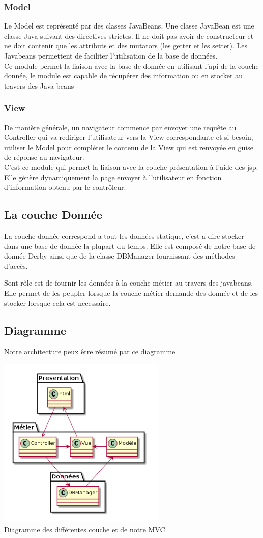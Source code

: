 \subsubsection{Model}
Le Model est représenté par des classes JavaBeans. Une classe JavaBean est une 
classe Java suivant des directives strictes. Il ne doit pas avoir de 
constructeur et ne doit contenir que les attributs et des mutators (les getter et les setter).
Les Javabeans permettent de faciliter l'utilisation de la base de données. \\
Ce module permet la liaison avec la base de donnée en utilisant l'api de la couche donnée, le module est capable de récupérer des information ou en stocker au travers des Java beans

\subsubsection{View}
De manière générale, un navigateur commence par envoyer une requête au 
Controller qui va rediriger l'utilisateur vers la View correspondante et si 
besoin, utiliser le Model pour compléter le contenu de la View qui est renvoyée en guise de réponse au navigateur.\\
C'est ce module qui permet la liaison avec la couche présentation à l'aide des jsp.
Elle génère dynamiquement la page envoyer à l'utilisateur en fonction d'information obtenu par le contrôleur.

\subsection{La couche Donnée}
La couche donnée correspond a tout les données statique, c'est a dire stocker dans une base de donnée la plupart du temps.
Elle est composé de notre base de donnée Derby ainsi que de la classe DBManager fournissant des méthodes d'accès.

Sont rôle est de fournir les données à la couche métier au travers des javabeans.
Elle permet de les peupler lorsque la couche métier demande des donnée et de les stocker lorsque cela est necessaire.

\subsection{Diagramme}
Notre architecture peux être résumé par ce diagramme
\begin{center}
\includegraphics[width=0.6\textwidth]{img/uml}\\
Diagramme des différentes couche et de notre MVC
\end{center}
